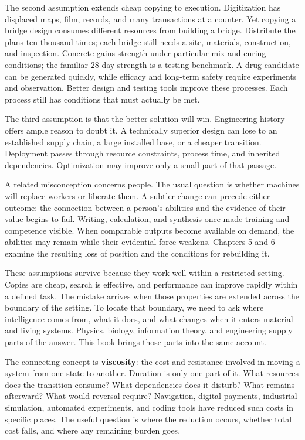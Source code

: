 \documentclass[11pt,openany]{book}
\newcommand{\term}[1]{\textbf{#1}}
\begin{document}
The second assumption extends cheap copying to execution. Digitization has displaced maps, film, records, and many transactions at a counter. Yet copying a bridge design consumes different resources from building a bridge. Distribute the plans ten thousand times; each bridge still needs a site, materials, construction, and inspection. Concrete gains strength under particular mix and curing conditions; the familiar 28-day strength is a testing benchmark. A drug candidate can be generated quickly, while efficacy and long-term safety require experiments and observation. Better design and testing tools improve these processes. Each process still has conditions that must actually be met.

The third assumption is that the better solution will win. Engineering history offers ample reason to doubt it. A technically superior design can lose to an established supply chain, a large installed base, or a cheaper transition. Deployment passes through resource constraints, process time, and inherited dependencies. Optimization may improve only a small part of that passage.

A related misconception concerns people. The usual question is whether machines will replace workers or liberate them. A subtler change can precede either outcome: the connection between a person's abilities and the evidence of their value begins to fail. Writing, calculation, and synthesis once made training and competence visible. When comparable outputs become available on demand, the abilities may remain while their evidential force weakens. Chapters 5 and 6 examine the resulting loss of position and the conditions for rebuilding it.

These assumptions survive because they work well within a restricted setting. Copies are cheap, search is effective, and performance can improve rapidly within a defined task. The mistake arrives when those properties are extended across the boundary of the setting. To locate that boundary, we need to ask where intelligence comes from, what it does, and what changes when it enters material and living systems. Physics, biology, information theory, and engineering supply parts of the answer. This book brings those parts into the same account.

The connecting concept is \term{viscosity}: the cost and resistance involved in moving a system from one state to another. Duration is only one part of it. What resources does the transition consume? What dependencies does it disturb? What remains afterward? What would reversal require? Navigation, digital payments, industrial simulation, automated experiments, and coding tools have reduced such costs in specific places. The useful question is where the reduction occurs, whether total cost falls, and where any remaining burden goes.
\end{document}

